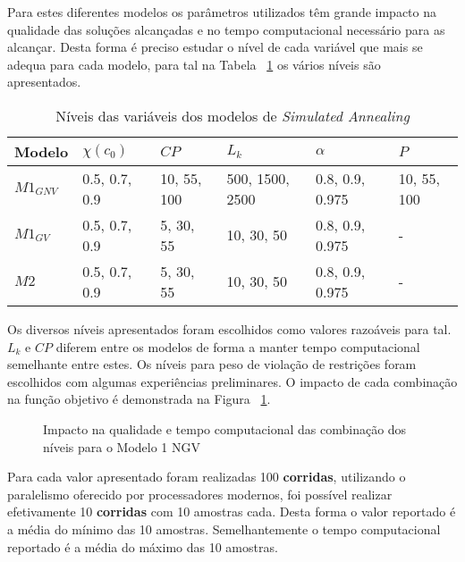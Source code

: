 Para estes diferentes modelos os parâmetros utilizados têm grande impacto na qualidade das soluções alcançadas e no tempo computacional necessário para as alcançar. Desta forma é preciso estudar o nível de cada variável que mais se adequa para cada modelo, para tal na Tabela ~\ref{tab:niveis_P1} os vários níveis são apresentados.

\begin{table}[H]
\caption{Níveis das variáveis dos modelos de \textit{Simulated Annealing}}
\label{tab:niveis_P1}
\begin{tabular}{llllll}
\hline
Modelo     & $\chi(c_{0})$ & $CP$       & $L_{k}$         & $\alpha$        & $P$         \\ \hline
$M1_{GNV}$ & 0.5, 0.7, 0.9 & 10, 55, 100 & 500, 1500, 2500 & 0.8, 0.9, 0.975 & 10, 55, 100 \\
$M1_{GV}$  & 0.5, 0.7, 0.9 & 5, 30, 55  & 10, 30, 50      & 0.8, 0.9, 0.975 & -           \\
$M2$       & 0.5, 0.7, 0.9 & 5, 30, 55  & 10, 30, 50      & 0.8, 0.9, 0.975 & -    
\end{tabular}
\end{table}

Os diversos níveis apresentados foram escolhidos como valores razoáveis para tal. $L_{k}$ e $CP$ diferem entre os modelos de forma a manter tempo computacional semelhante entre estes. Os níveis para peso de violação de restrições foram escolhidos com algumas experiências preliminares. O impacto de cada combinação na função objetivo é demonstrada na Figura ~\ref{fig:comb_prob1_mod1NGV}.\\

\begin{figure}[h]
	\centering
	\caption{Impacto na qualidade e tempo computacional das combinação dos níveis para o Modelo 1 NGV}
	\label{fig:comb_prob1_mod1NGV}
\end{figure}

Para cada valor apresentado foram realizadas 100 \textbf{corridas}, utilizando o paralelismo oferecido por processadores modernos, foi possível realizar efetivamente 10 \textbf{corridas} com 10 amostras cada. Desta forma o valor reportado é a média do mínimo das 10 amostras. Semelhantemente o tempo computacional reportado é a média do máximo das 10 amostras.\\
 
